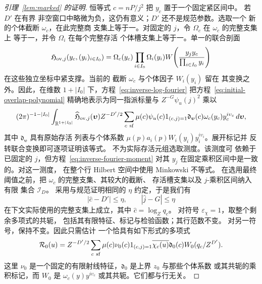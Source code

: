 \documentclass[11pt,a4paper]{article}
\numberwithin{equation}{section}
\numberwithin{figure}{section}
\theoremstyle{definition}
\theoremstyle{remark}
\begin{document}
\begin{proof}[引理~\ref{lem:marked} 的证明]
恒等式 \(c=nP/j^2\) 把 \(y_c\) 置于一个固定紧区间中。
若 \(D'\) 在有界
非空窗口中略微为负，这仍有意义；\(D'\) 还不是规范参数。选取一个
新的个体截断 \(\omega_c\)，在此完整商
支集上等于一。对固定的 \(j\)，令 \(\Omega_c\) 在 \(\omega_c\) 的完整支集上
等于一，并令 \(\Omega_i\) 在每个完整存活
个体槽支集上等于一。单一的联合剖面
\[
 \mathfrak H_{{\rm ov},j}(y_c,(y_i)_{i\in I_0})
 =\Omega_c(y_c)\prod_{i\in I_0}\Omega_i(y_i)
 W\!\left(\frac{y_jy_c}{\prod_{i\in I_0}y_i}\right)
\]
在这些独立坐标中紧支撑。当前的
截断 \(\omega_c\) 与个体因子 \(W_i(y_i)\) 留在
其变换之外。因此，在维数
\(1+|I_0|\) 下，方程~\eqref{eq:inverse-log-fourier} 把方程~\eqref{eq:initial-overlap-polynomial}
精确地表示为同一指派标量与 \(Z^{-G}\psi_u(j)^2\) 乘以
\[
 (2\pi)^{-1-|I_0|}\int_{\mathbb R^{1+|I_0|}}
 \widehat{\mathfrak H}_{{\rm ov},j}(\boldsymbol\upsilon)
 Z^{-D'/2}\sum_{c\ {\rm sf}}\mu(c)\psi_u(c)1_{(c,j)=1}
 \mathfrak d_{\boldsymbol\upsilon}(c)
 \omega_c(y_c)y_c^{i\upsilon_c}\,d\boldsymbol\upsilon,
\]
其中 \(\mathfrak d_{\boldsymbol\upsilon}\) 具有原始存活
列表与个体系数
\(\mu(p)a_i(p)W_i(y_i)y_i^{i\upsilon_i}\)。展开标记并
反转联合变换即可逐项证明该等式。
不为实际存活元组选取测度。该测度可
依赖于已固定的 \(j\)，但方程~\eqref{eq:inverse-fourier-moment}
对其 \(y_j\) 在固定乘积区间中是一致的。对这一测度，
在整个行 Hilbert 空间中使用 Minkowski
不等式。
在选用最终阈值之前，把 \(\omega_c\) 的完整支集、其较大的截断、
存活槽支集以及 \(j\)-乘积区间纳入有限
集合 \(\mathcal I_D\)。
采用与规范证明相同的 \(\eta\) 约定，于是我们有
\[
 |\widehat c-D'|\le\eta,\qquad |\widehat j-G|\le\eta
\]
在下文实际使用的完整支集上成立，其中 \(\widehat c=\log_Zq_c\)。
对符号
\(\varepsilon_\chi=1\)，取整个剩余多项式的共轭，
包括其有限特征、标记与检验函数；其行范数不变。
对另一符号，保持不变。因此只需估计
一个恰具有如下形式的多项式
\begin{equation}\label{eq:initial-residual-polynomial}
 \mathcal R_0(u)=Z^{-D'/2}\sum_{c\ {\rm sf}}
 \mu(c)\nu_0(c)1_{(c,j)=1}\overline{\chi_c(u)}
 \mathfrak d_0(c)W_0(q_c/Z^{D'}).
\end{equation}
这里 \(\nu_0\) 是一个固定的有限射线特征，\(\mathfrak d_0\)
是上界 \(z_0\) 与那些个体系数
或其共轭的乘积标记，而 \(W_0\) 是 \(\omega_c(y)y^{i\upsilon_c}\)
或其共轭。它们都与行无关。


\end{proof}
\end{document}
